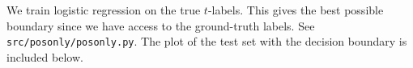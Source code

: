 \begin{answer}
We train logistic regression on the true $t$-labels. This gives the best possible boundary since we have access to the ground-truth labels. See \texttt{src/posonly/posonly.py}. The plot of the test set with the decision boundary is included below.
\end{answer}
